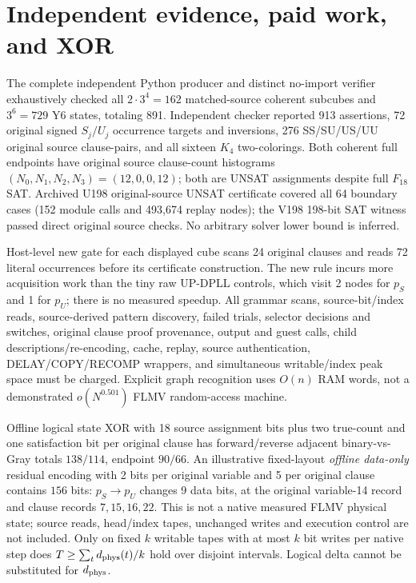 \documentclass[11pt]{article}
\begin{document}
\section{Independent evidence, paid work, and XOR}
The complete independent Python producer and distinct no-import verifier exhaustively checked all $2\cdot3^4=162$ matched-source coherent subcubes and $3^6=729$ Y6 states, totaling 891. Independent checker reported 913 assertions, 72 original signed $S_j/U_j$ occurrence targets and inversions, 276 SS/SU/US/UU original source clause-pairs, and all sixteen $K_4$ two-colorings. Both coherent full endpoints have original source clause-count histograms $(N_0,N_1,N_2,N_3)=(12,0,0,12)$; both are UNSAT assignments despite full $F_{18}$ SAT. Archived U198 original-source UNSAT certificate covered all 64 boundary cases (152 module calls and 493,674 replay nodes); the V198 198-bit SAT witness passed direct original source checks. No arbitrary solver lower bound is inferred.

Host-level new gate for each displayed cube scans 24 original clauses and reads 72 literal occurrences before its certificate construction. The new rule incurs more acquisition work than the tiny raw UP-DPLL controls, which visit 2 nodes for $p_S$ and 1 for $p_U$; there is no measured speedup. All grammar scans, source-bit/index reads, source-derived pattern discovery, failed trials, selector decisions and switches, original clause proof provenance, output and guest calls, child descriptions/re-encoding, cache, replay, source authentication, DELAY/COPY/RECOMP wrappers, and simultaneous writable/index peak space must be charged. Explicit graph recognition uses $O(n)$ RAM words, not a demonstrated $o(N^{0.501})$ FLMV random-access machine.

Offline logical state XOR with 18 source assignment bits plus two true-count and one satisfaction bit per original clause has forward/reverse adjacent binary-vs-Gray totals $138/114$, endpoint $90/66$. An illustrative fixed-layout \emph{offline data-only} residual encoding with 2 bits per original variable and 5 per original clause contains $156$ bits: $p_S\to p_U$ changes 9 data bits, at the original variable-14 record and clause records $7,15,16,22$. This is not a native measured FLMV physical state; source reads, head/index tapes, unchanged writes and execution control are not included. Only on fixed $k$ writable tapes with at most $k$ bit writes per native step does $T\ge\sum_t d_{\rm phys}(t)/k$ hold over disjoint intervals. Logical delta cannot be substituted for $d_{\rm phys}$.
\end{document}
